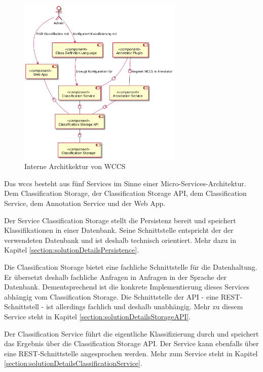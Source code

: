         \begin{figure}
            \centering
            \includegraphics[width=0.7\textwidth]{../resources/architecture/wccs_internal_architecture.png}
            \caption{Interne Architkektur von WCCS}
            \label{image:wccsInternalArchitecture}
        \end{figure}

        Das \gls{wccs} besteht aus fünf Services im Sinne einer Micro-Services-Architektur.
        Dem Classification Storage, der Classification Storage API, dem Classification Service, dem
        Annotation Service und der Web App.

        Der Service Classification Storage stellt die Persistenz bereit und speichert
        Klassifikationen in einer Datenbank.
        Seine Schnittstelle entspricht der der verwendeten Datenbank und ist deshalb
        technisch orientiert.
        Mehr dazu in Kapitel \ref{section:solutionDetailsPersistence}.

        Die Classification Storage bietet eine fachliche Schnittstelle für die Datenhaltung.
        Er übersetzt deshalb fachliche Anfragen in Anfragen in der Sprache der Datenbank.
        Dementsprechend ist die konkrete Implementierung dieses Services abhängig vom Classification Storage.
        Die Schnittstelle der API - eine REST-Schnittstell - ist allerdings fachlich und deshalb
        unabhängig. Mehr zu diesem Service steht in  Kapitel \ref{section:solutionDetailsStorageAPI}.

        Der Classification Service führt die eigentliche Klassifizierung durch
        und speichert das Ergebnis über die Classification Storage API.
        Der Service kann ebenfalls über eine REST-Schnittstelle angesprochen werden.
        Mehr zum Service steht in Kapitel \ref{section:solutionDetailsClassificationService}.

